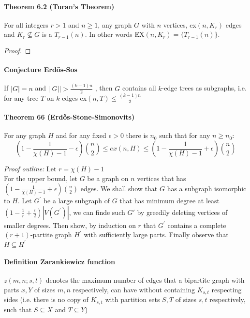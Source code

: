 \paragraph{Theorem 6.2 (Turan's Theorem)} For all integers $ r > 1 $ and $ n \geq 1$,
any graph $ G $ with $ n $ vertices, ex$(n,K_r)$ edges and $ K_r \nsubseteq G $ 
is a $ T_{r-1}(n) $. In other words EX$(n,K_r) = \{T_{r-1}(n)\}$.
\begin{proof}
        
\end{proof}

\paragraph{Conjecture Erd\H{o}s-Sos} If $ |G| = n$ and $||G|| > \frac{(k-1)n}{2}$
, then $ G $ contains all $k$-edge trees as subgraphs, i.e. for any tree 
$ T $ on $ k $ edges ex$(n,T) \leq \frac{(k-1)n}{2}$

\paragraph{Theorem 66 (Erd\H{o}s-Stone-Simonovits)} For any graph $ H $ and for any 
fixed $ \epsilon > 0 $ there is $ n_0 $ such that for any $ n \geq n_0 $:
$$ (1 - \frac{1}{\chi(H)-1} - \epsilon)\binom{n}{2} \leq ex(n,H) \leq
(1 - \frac{1}{\chi(H)-1}+\epsilon) \binom{n}{2} $$

\smallskip \noindent
\textit{Proof outline:} Let $ r = \chi(H) - 1 $ \\
For the upper bound, let $ G $ be a graph on $ n $ vertices that has 
$ (1 - \frac{1}{\chi(H) - 1} + \epsilon) \binom{n}{2} $ edges. We shall show 
that $ G $ has a subgraph isomorphic to $ H $. Let $ G^\prime $ be a large 
subgraph of $ G $ that has minimum degree at least 
$ (1 - \frac{1}{r} + \frac{\epsilon}{2}) |V(G^\prime)|$, we can finde such 
$ G\prime $ by greedily deleting vertices of smaller degrees. Then show, 
by induction on $ r $ that $ G^\prime $ contains a complete $(r+1)$-partite 
graph $ H^\prime $ with sufficiently large parts. Finally observe that 
$ H \subseteq H^\prime $

\paragraph{Definition Zarankiewicz function} $ z(m,n;s,t) $ denotes the maximum
number of edges that a bipartite graph with parts $ x,Y$ of sizes $ m,n$
respectively, can have without containing $ K_{s,t} $ respecting sides
(i.e. there is no copy of $ K_{s,t} $ with partition sets $ S,T $ of sizes
$s,t $ respectively, such that $ S \subseteq X $ and $ T \subseteq Y $)

